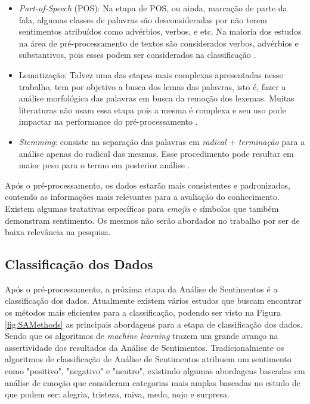 \begin{itemize}
\item \textit{Part-of-Speech} (POS): Na etapa de POS, ou ainda, marcação de parte da fala, algumas classes de palavras são desconsideradas por não terem sentimentos atribuídos como advérbios, verbos, e etc. Na maioria dos estudos na área de pré-processamento de textos são considerados verbos, advérbios e substantivos, pois esses podem ser considerados na classificação \cite{Barbosa:2010:RSD:1944566.1944571}.

\item Lematização: Talvez uma das etapas mais complexas apresentadas nesse trabalho, tem por objetivo a busca dos lemas das palavras, isto é, fazer a análise morfológica das palavras em busca da remoção dos lexemas. Muitas literaturas não usam essa etapa pois a mesma é complexa e seu uso pode impactar na performance do pré-processamento \cite{Guzman2014}.

\item \textit{Stemming}: consiste na separação das palavras em \textit{radical} + \textit{terminação} para a análise apenas do radical das mesmas. Esse procedimento pode resultar em maior peso para o termo em posterior análise \cite{Porter1980}.
\end{itemize}

Após o pré-processamento, os dados estarão mais consistentes e padronizados, contendo as informações mais relevantes para a avaliação do conhecimento. Existem algumas tratativas específicas para \textit{emojis} e símbolos que também demonstram sentimento. Os mesmos não serão abordados no trabalho por ser de baixa relevância na pesquisa.

\subsection{Classificação dos Dados}
Após o pré-processamento, a próxima etapa da Análise de Sentimentos é a classificação dos dados. Atualmente existem vários estudos que buscam encontrar os métodos mais eficientes para a classificação, podendo ser visto na Figura \ref{fig:SAMethods} as principais abordagens para a etapa de classificação dos dados. Sendo que os algoritmos de \textit{machine learning} trazem um grande avanço na assertividade dos resultados da Análise de Sentimentos. Tradicionalmente os algoritmos de classificação de Análise de Sentimentos atribuem um sentimento como "positivo", "negativo" e "neutro", existindo algumas abordagens baseadas em análise de emoção que consideram categorias mais amplas baseadas no estudo de  que podem ser: alegria, tristeza, raiva, medo, nojo e surpresa.  

